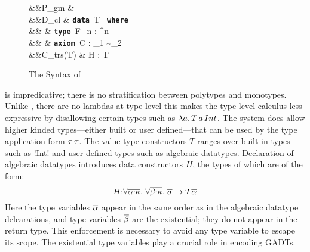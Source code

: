 \documentclass[manuscript,screen,nonacm]{acmart}
\begin{document}
\begin{figure}[ht]
  \begin{syntax}
     &&P_{gm} \bnfeq&  \mathrel{;} \many{\Tm}\\
     &&D_{cl} \bnfeq& \textbf{\texttt{data }}\App T\co\many{\kappa} \to \star\App \textbf{\texttt{ where }}\App {} \\
                             &&       \bnfor& \textbf{\texttt{type }}\App F_n : \many\kappa^n \to \kappa\\
                             &&       \bnfor&  \textbf{\texttt{axiom }}\App C\App \many{\TyVar\co\kappa} : \sigma_1 \sim \sigma_2\\
     &&C_{trs}(T) \bnfeq& H : \Forall {\many{\TyVar\co\kappa}} { \many{(\tau \sim \tau)} \then \many\sigma \to T\many\TyVar}\\
  \end{syntax}

  \caption{The Syntax of \SFC}
  \label{fig:system-fc-syntax}
\end{figure}

\SFC is impredicative; there is no stratification between polytypes and monotypes. Unlike \SFw, there are no lambdas at type level this makes the type level calculus less expressive by disallowing certain types such as $\lambda a.\, T\, a\, Int$. The system does allow higher kinded types---either built or user defined---that can be used by the type application form $\tau\,\tau$.  The value type constructors $T$ ranges over built-in types such as !Int! and user defined types such as algebraic datatypes. Declaration of algebraic datatypes introduces data constructors $H$, the types of which are of the form:
$$
H {:} \forall\overline{\alpha{:}\kappa}.~\forall\overline{\beta{:}\kappa}.~\overline{\sigma} \to T \overline{\alpha}
$$
Here the type variables $\overline{\alpha}$ appear in the same order as in the algebraic datatype delcarations,  and type variables $\overline{\beta}$ are the existential; they do not appear in the return type. This enforcement is necessary to avoid any type variable to escape its scope. The existential type variables play a crucial role in encoding GADTs.
\end{document}
